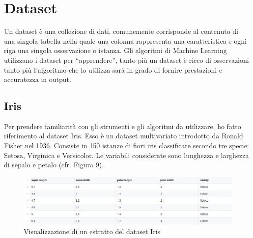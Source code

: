 \documentclass[12pt,italian]{report}
\begin{document}


\chapter{Dataset}
\label{dataset}
Un dataset è una collezione di dati, comunemente corrisponde al contenuto di una singola tabella nella quale una colonna rappresenta una caratteristica e ogni riga una singola osservazione o istanza. Gli algoritmi di Machine Learning utilizzano i dataset per ``apprendere'', tanto più un dataset è ricco di osservazioni tanto più l'algoritmo che lo utilizza sarà in grado di fornire prestazioni e accuratezza in output. 

\section{Iris}
\label{iris}
Per prendere familiarità con gli strumenti e gli algoritmi da utilizzare, ho fatto riferimento al dataset Iris. Esso è un dataset multivariato introdotto da Ronald Fisher nel 1936. Consiste in 150 istanze di fiori iris classificate secondo tre specie: Setosa, Virginica e Versicolor.
Le variabili considerate sono lunghezza e larghezza di sepalo e petalo (cfr. Figura 9). 
\begin{figure}[h]
	\centering
	\includegraphics[width = \textwidth]{immagini/Iris}
	\caption{Visualizzazione di un estratto del dataset Iris}
\end{figure}
\end{document}
